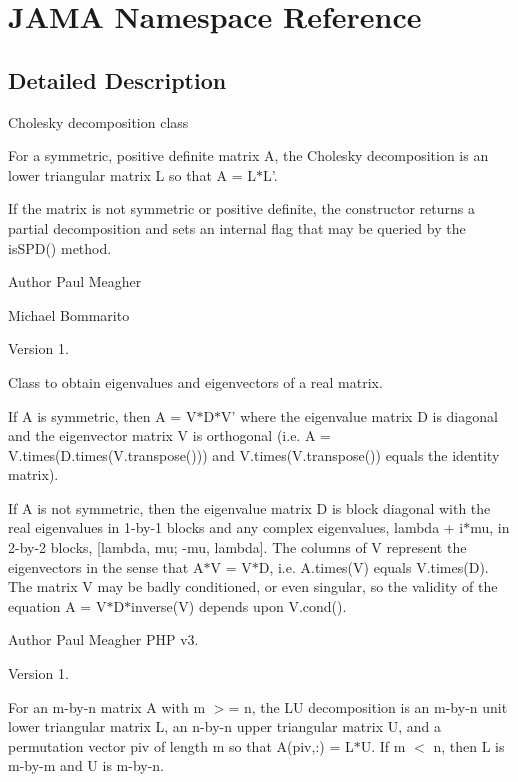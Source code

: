 \section{J\+A\+M\+A Namespace Reference}
\label{namespace_j_a_m_a}


\subsection{Detailed Description}
Cholesky decomposition class

For a symmetric, positive definite matrix A, the Cholesky decomposition is an lower triangular matrix L so that A = L$\ast$\+L'.

If the matrix is not symmetric or positive definite, the constructor returns a partial decomposition and sets an internal flag that may be queried by the is\+S\+P\+D() method.

\begin{DoxyAuthor}{Author}
Paul Meagher 

Michael Bommarito 
\end{DoxyAuthor}
\begin{DoxyVersion}{Version}
1.
\end{DoxyVersion}
Class to obtain eigenvalues and eigenvectors of a real matrix.

If A is symmetric, then A = V$\ast$\+D$\ast$\+V' where the eigenvalue matrix D is diagonal and the eigenvector matrix V is orthogonal (i.\+e. A = V.\+times(D.\+times(V.\+transpose())) and V.\+times(V.\+transpose()) equals the identity matrix).

If A is not symmetric, then the eigenvalue matrix D is block diagonal with the real eigenvalues in 1-\/by-\/1 blocks and any complex eigenvalues, lambda + i$\ast$mu, in 2-\/by-\/2 blocks, [lambda, mu; -\/mu, lambda]. The columns of V represent the eigenvectors in the sense that A$\ast$\+V = V$\ast$\+D, i.\+e. A.\+times(\+V) equals V.\+times(\+D). The matrix V may be badly conditioned, or even singular, so the validity of the equation A = V$\ast$\+D$\ast$inverse(V) depends upon V.\+cond().

\begin{DoxyAuthor}{Author}
Paul Meagher  P\+H\+P v3. 
\end{DoxyAuthor}
\begin{DoxyVersion}{Version}
1.
\end{DoxyVersion}
For an m-\/by-\/n matrix A with m $>$= n, the L\+U decomposition is an m-\/by-\/n unit lower triangular matrix L, an n-\/by-\/n upper triangular matrix U, and a permutation vector piv of length m so that A(piv,\+:) = L$\ast$\+U. If m $<$ n, then L is m-\/by-\/m and U is m-\/by-\/n.


